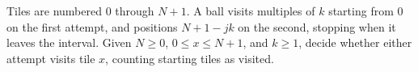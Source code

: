 Tiles are numbered 0 through $N+1$. A ball visits multiples of $k$ starting from 0 on the first attempt, and positions $N+1-jk$ on the second, stopping when it leaves the interval. Given $N\ge0$, $0\le x\le N+1$, and $k\ge1$, decide whether either attempt visits tile $x$, counting starting tiles as visited.

